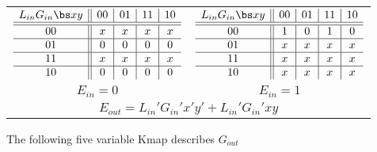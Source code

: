 \begin{enumerate}
\begin{onlysolution}
{                    \begin{tabular}{cc}
                        $
                        \begin{array} {c||c|c|c|c}
                            L_{in} G_{in}  \bs x  y & 00 & 01 & 11 & 10 \\ \hline \hline
                            00       & x  & x  & x  &  x \\ \hline
                            01       & 0  & 0  & 0  &  0 \\ \hline
                            11       & x  & x  & x  &  x \\ \hline
                            10       & 0  & 0  & 0  &  0 \\
                        \end{array}$
                        &
                        $
                        \begin{array} {c||c|c|c|c}
                            L_{in} G_{in}  \bs x  y & 00 & 01 & 11 & 10 \\ \hline \hline
                            00       & 1  & 0  & 1  & 0  \\ \hline
                            01       & x  & x  & x  & x  \\ \hline
                            11       & x  & x  & x  & x  \\ \hline
                            10       & x  & x  & x  & x  \\
                        \end{array}$  \\
                        $E_{in}=0$ & $E_{in}=1$ \\
                        \multicolumn{2}{c}{$E_{out} = L_{in}'G_{in}'x'y' + L_{in}'G_{in}'xy $} \\
                    \end{tabular}

                    The following five variable Kmap describes $G_{out}$

}
\end{onlysolution}
\end{enumerate}
